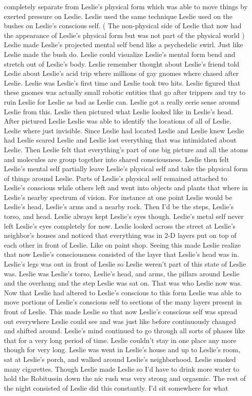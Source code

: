 \documentclass[12pt]{book}
\begin{document}
completely separate from Leslie's physical form which was able to move things by exerted pressure on Leslie. Leslie used the same technique Leslie used on the bushes on Leslie's conscious self. ( The non-physical side of Leslie that now had the appearance of Leslie's physical form but was not part of the physical world ) Leslie made Leslie's projected mental self bend like a psychedelic swirl. Just like Leslie made the bush do. Leslie could visualize Leslie's mental form bend and stretch out of Leslie's body. Leslie remember thought about Leslie's friend told Leslie about Leslie's acid trip where millions of gay gnomes where chased after Leslie. Leslie was Leslie's first time and Leslie took two hits. Leslie figured that these gnomes was actually small robotic entities that go after trippers and try to ruin Leslie for Leslie as bad as Leslie can. Leslie got a really eerie sense around Leslie from this. Leslie then pictured what Leslie looked like in Leslie's head. After pictured Leslie Leslie was able to identify the locations of all of Leslie. Leslie where just invisible. Since Leslie had located Leslie and Leslie knew Leslie had Leslie scared Leslie and Leslie lost everything that was intimidated about Leslie. Then Leslie felt that everything's part of one big picture and all the atoms and molecules are group together into shared consciousness. Leslie then felt Leslie's mental self partially leave Leslie's physical self and take the physical form of things around Leslie. Parts of Leslie's physical self remained attached to Leslie's conscious while others left and went into objects and plants that where in Leslie's nearby spectrum of vision. For instance at one point Leslie would be Leslie's head, Leslie's arms and a nearby rock. Then I'd be the steps, Leslie's torso, and head. Leslie always kept Leslie's eyes though. Leslie's metal self never left Leslie's eyes completely for now. Leslie looked across the street at Leslie's neighbor's houses and noticed that everything was in 2-D layers put on top of each other in front of Leslie. Like on paint shop. Seeing this made Leslie realize that now Leslie's consciousness consisted of the layer that Leslie's head was in. Leslie's legs was out in front of Leslie so Leslie weren't part of this state of Leslie was. Leslie was Leslie's torso, Leslie's head, and arms, the pillars around Leslie and the overhang and the step Leslie was sat on. That was who Leslie now was. Now that Leslie had altered to Leslie's conscious to this form Leslie was able to move portions of Leslie's conscious self to sections of the many layers present in front of Leslie. This made Leslie so that now Leslie's conscious self was spread out everywhere Leslie could see and was just like before continuously changed and shifted around. Leslie's mind continued to go through all sorts of phases like that for a very long period of time. Leslie couldn't stay in one place any more though for very long. Leslie was went in Leslie's house and up to Leslie's room, sat at Leslie's porch, and walked around Leslie's neighborhood. Leslie smoked many cigarettes. Though Leslie made Leslie so I'd have to drink more water to hold the Robitussin down the nic rush was very strong and orgasmic. The rest of the night consisted of Leslie did this constantly. I'd sit somewhere for what 
\end{document}
